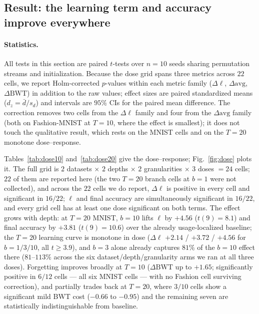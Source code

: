 \documentclass[review,12pt,number]{elsarticle}
\begin{document}
\subsection{Result: the learning term and accuracy improve everywhere}
\label{sec:dosestat}

\paragraph{Statistics.} All tests in this section are paired $t$-tests over $n=10$ seeds sharing permutation streams and initialization. Because the dose grid spans three metrics across $22$ cells, we report Holm-corrected $p$-values within each metric family ($\Delta\ell$, $\Delta\mathrm{avg}$, $\Delta\mathrm{BWT}$) in addition to the raw values; effect sizes are paired standardized means ($d_z=\bar{d}/s_d$) and intervals are $95\%$ CIs for the paired mean difference. The correction removes two cells from the $\Delta\ell$ family and four from the $\Delta\mathrm{avg}$ family (both on Fashion-MNIST at $T=10$, where the effect is smallest); it does not touch the qualitative result, which rests on the MNIST cells and on the $T=20$ monotone dose--response.

Tables~\ref{tab:dose10} and~\ref{tab:dose20} give the dose--response;
Fig.~\ref{fig:dose} plots it. The full grid is
$2$ datasets $\times$ $2$ depths $\times$ $2$ granularities $\times$
$3$ doses $=24$ cells; $22$ of them are reported here (the two
$T{=}20$ branch cells at $b{=}1$ were not collected), and across the $22$
cells we do report, $\Delta\ell$ is positive in every cell and
significant in
$16/22$; $\ell$ and final accuracy are simultaneously
significant in $16/22$, and every grid cell has at least one dose
significant on both terms. The effect grows with depth: at $T{=}20$ MNIST,
$b{=}10$ lifts $\ell$ by $+4.56$ ($t(9){=}8.1$) and final accuracy by
$+3.81$ ($t(9){=}10.6$) over the already usage-localized baseline; the
$T{=}20$ learning curve is monotone in dose
($\Delta\ell$ $+2.14$ / $+3.72$ / $+4.56$ for $b{=}1/3/10$, all
$t \ge 3.9$), and $b{=}3$ alone already captures $81\%$ of the
$b{=}10$ effect there ($81$--$113\%$ across the six dataset/depth/granularity
arms we ran at all three doses). Forgetting
improves broadly at $T{=}10$ ($\Delta\mathrm{BWT}$ up to $+1.65$;
significantly positive in $6/12$ cells --- all six MNIST cells --- with
      no Fashion cell surviving correction), and
partially trades back at $T{=}20$, where $3/10$ cells show a significant
mild BWT cost ($-0.66$ to $-0.95$) and the remaining seven are
statistically indistinguishable from baseline.
\end{document}

